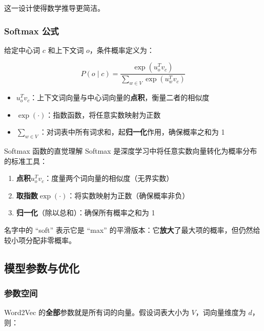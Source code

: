 \documentclass[a4paper]{article}
\begin{document}
这一设计使得数学推导更简洁。

\subsubsection{Softmax 公式}

给定中心词 $c$ 和上下文词 $o$，条件概率定义为：

$$P(o \mid c) = \frac{\exp(u_o^T v_c)}{\sum_{w \in V} \exp(u_w^T v_c)}$$

\begin{itemize}
    \item $u_o^T v_c$：上下文词向量与中心词向量的\textbf{点积}，衡量二者的相似度
    \item $\exp(\cdot)$：指数函数，将任意实数映射为正数
    \item $\sum_{w \in V}$：对词表中所有词求和，起\textbf{归一化}作用，确保概率之和为 1
\end{itemize}





\begin{importantbox}{Softmax 函数的直觉理解}
Softmax 是深度学习中将任意实数向量转化为概率分布的标准工具：
\begin{enumerate}
    \item \textbf{点积}$u_o^T v_c$：度量两个词向量的相似度（无界实数）
    \item \textbf{取指数}$\exp(\cdot)$：将实数映射为正数（确保概率非负）
    \item \textbf{归一化}（除以总和）：确保所有概率之和为 1
\end{enumerate}
名字中的 ``soft'' 表示它是 ``max'' 的平滑版本：它\textbf{放大}了最大项的概率，但仍然给较小项分配非零概率。
\end{importantbox}

\subsection{模型参数与优化}

\subsubsection{参数空间}

Word2Vec 的\textbf{全部}参数就是所有词的向量。假设词表大小为 $V$，词向量维度为 $d$，则：


\end{document}
